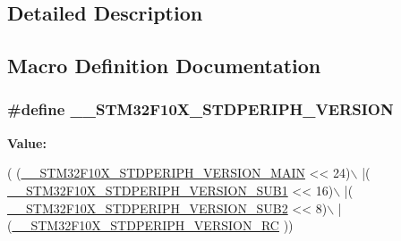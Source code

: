 \subsection{Detailed Description}


\subsection{Macro Definition Documentation}
\hypertarget{group___library__configuration__section_gafb19c8675ea01accc2f8e5f467827328}{
\subsubsection[{\-\_\-\-\_\-\-S\-T\-M32\-F10\-X\-\_\-\-S\-T\-D\-P\-E\-R\-I\-P\-H\-\_\-\-V\-E\-R\-S\-I\-O\-N}]{\setlength{\rightskip}{0pt plus 5cm}\#define \-\_\-\-\_\-\-S\-T\-M32\-F10\-X\-\_\-\-S\-T\-D\-P\-E\-R\-I\-P\-H\-\_\-\-V\-E\-R\-S\-I\-O\-N}}\label{group___library__configuration__section_gafb19c8675ea01accc2f8e5f467827328}
{\bfseries Value\-:}
\begin{DoxyCode}
( (\hyperlink{group___library__configuration__section_ga4c236abf68876febcb304f05ed3bafac}{\_\_STM32F10X\_STDPERIPH\_VERSION\_MAIN} << 24)\(\backslash\)
                                             |(
      \hyperlink{group___library__configuration__section_ga7ce69a7c755b9d0551e9755d28612cb0}{\_\_STM32F10X\_STDPERIPH\_VERSION\_SUB1} << 16)\(\backslash\)
                                             |(
      \hyperlink{group___library__configuration__section_ga3ec41777ab08436b801c9c295248a6c7}{\_\_STM32F10X\_STDPERIPH\_VERSION\_SUB2} << 8)\(\backslash\)
                                             |(\hyperlink{group___library__configuration__section_gae0abedef178fde6294fdfd3401ef6e2c}{\_\_STM32F10X\_STDPERIPH\_VERSION\_RC}
      ))
\end{DoxyCode}
